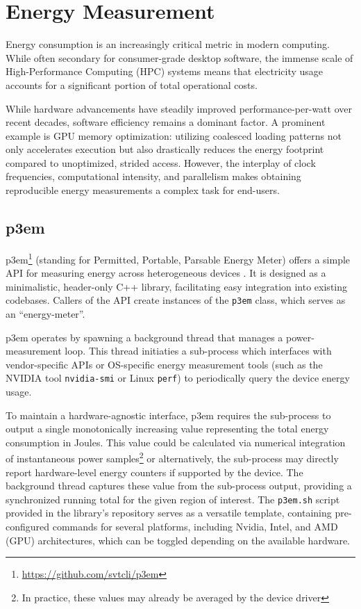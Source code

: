 \documentclass[a4paper,12pt]{article}
\begin{document}
\newpage
\section{{Energy Measurement}}
\label{sec:section4}

Energy consumption is an increasingly critical metric in modern computing.
While often secondary for consumer-grade desktop software, the immense scale of
High-Performance Computing (HPC) systems means that electricity usage
accounts for a significant portion of total operational costs.

While hardware advancements have steadily improved performance-per-watt over recent decades, software efficiency remains a dominant factor. A prominent example is GPU memory optimization: utilizing coalesced loading patterns not only accelerates execution but also drastically reduces the energy footprint compared to unoptimized, strided access. However, the interplay of clock frequencies, computational intensity, and parallelism makes obtaining reproducible energy measurements a complex task for end-users.

\subsection{{p3em}}

p3em\footnote{\url{https://github.com/svtcli/p3em}} (standing for Permitted, Portable, Parsable Energy Meter)
offers a simple API for measuring energy across heterogeneous devices \cite{Cielo2025}.
It is designed as a minimalistic, header-only C++ library, facilitating
easy integration into existing codebases.
Callers of the API create instances of the \texttt{p3em} class, which serves as an ``energy-meter''.

p3em operates by spawning a background thread that manages a power-measu\-rement loop.
This thread initiaties a sub-process which interfaces with vendor-specific APIs or
OS-specific energy measurement tools (such as the NVIDIA tool \texttt{nvidia-smi} or Linux \texttt{perf})
to periodically query the device energy usage.

To maintain a hardware-agnostic interface, p3em requires the sub-process to
output a single monotonically increasing value representing the total energy
consumption in Joules.
This value could be calculated via numerical integration
of instantaneous power samples\footnote{In practice, these values may already be averaged by the device driver}
or alternatively, the sub-process may directly report hardware-level energy
counters if supported by the device.
The background thread captures these value from the sub-process output,
providing a synchronized running total for the given region of interest.
The \texttt{p3em.sh} script provided in the library's repository serves
as a versatile template, containing pre-configured commands for several
platforms, including Nvidia, Intel, and AMD (GPU) architectures,
which can be toggled depending on the available hardware.
\end{document}
